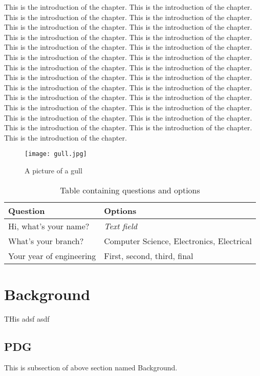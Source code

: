 \documentclass{nithreport}
\begin{document}
This is the introduction of the chapter. This is the introduction of the chapter. This is the introduction of the chapter. This is the introduction of the chapter. This is the introduction of the chapter. This is the introduction of the chapter. This is the introduction of the chapter.\cite{big} This is the introduction of the chapter. This is the introduction of the chapter. This is the introduction of the chapter. This is the introduction of the chapter. This is the introduction of the chapter. This is the introduction of the chapter. This is the introduction of the chapter. This is the introduction of the chapter. This is the introduction of the chapter. This is the introduction of the chapter. This is the introduction of the chapter. This is the introduction of the chapter. This is the introduction of the chapter. This is the introduction of the chapter. This is the introduction of the chapter. This is the introduction of the chapter. This is the introduction of the chapter. This is the introduction of the chapter. This is the introduction of the chapter. This is the introduction of the chapter.

\begin{figure}
  \centering %
  \texttt{[image: gull.jpg]}
  \caption{A picture of a gull}
\end{figure}

\begin{table}[h!]
\begin{tabular}{ | p{2in} | p{4in}| } 
\hline
{\bf Question} & {\bf Options} \\
\hline
Hi, what's your name? & {\it Text field} \\
\hline
What's your branch? & Computer Science, Electronics, Electrical \\
\hline
Your year of engineering & First, second, third, final \\
\hline
\end{tabular}
\caption{Table containing questions and options}
\end{table}

\section{Background}
THis adsf asdf

\subsection{PDG}
This is subsection of above section named Background.
\end{document}
